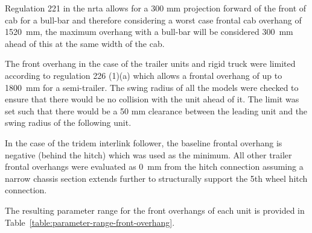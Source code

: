 Regulation 221 in the \gls{nrta} allows for a 300 mm projection forward of the front of cab for a bull-bar and therefore considering a worst case frontal cab overhang of 1520~mm, the maximum overhang with a bull-bar will be considered 300~mm ahead of this at the same width of the cab.

The front overhang in the case of the trailer units and rigid truck were limited according to regulation 226 (1)(a) which allows a frontal overhang of up to 1800~mm for a semi-trailer.  The swing radius of all the models were checked to ensure that there would be no collision with the unit ahead of it. The limit was set such that there would be a 50 mm clearance between the leading unit and the swing radius of the following unit.

In the case of the tridem interlink follower, the baseline frontal overhang is negative (behind the hitch) which was used as the minimum. All other trailer frontal overhangs were evaluated as 0~mm from the hitch connection assuming a narrow chassis section extends further to structurally support the 5th wheel hitch connection.

The resulting parameter range for the front overhangs of each unit is provided in Table~\ref{table:parameter-range-front-overhang}.

